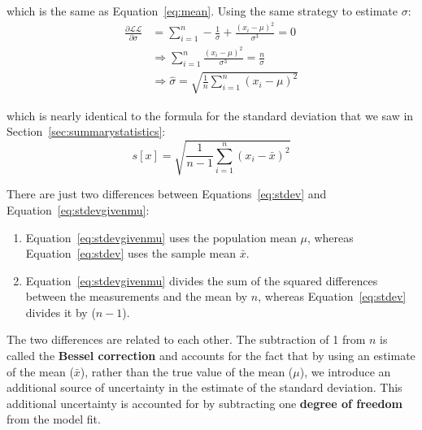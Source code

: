 \begin{refsection}
\noindent which is the same as Equation~\ref{eq:mean}. Using the same
strategy to estimate $\sigma$:
\begin{equation}
  \begin{split}
    \frac{\partial{\mathcal{LL}}}{\partial{\sigma}} & =
    \sum\limits_{i=1}^{n} - \frac{1}{\sigma} +  \frac{(x_i-\mu)^2}{\sigma^3} = 0\\
    & \Rightarrow  \sum\limits_{i=1}^{n} \frac{(x_i-\mu)^2}{\sigma^3} = \frac{n}{\sigma} \\
    & \Rightarrow \hat{\sigma} = \sqrt{\frac{1}{n}\sum\limits_{i=1}^{n}(x_i-\mu)^2}
  \end{split}
  \label{eq:stdevgivenmu}
\end{equation}

\noindent which is nearly identical to the formula for the standard
deviation that we saw in Section~\ref{sec:summarystatistics}:
\begin{equation}
  s[x] = \sqrt{\frac{1}{n-1}\sum\limits_{i=1}^{n}(x_i-\bar{x})^2}
  \label{eq:stdev}
\end{equation}

There are just two differences between
Equations~\ref{eq:stdev} and
Equation~\ref{eq:stdevgivenmu}:
\begin{enumerate}
\item Equation~\ref{eq:stdevgivenmu} uses the population mean $\mu$,
  whereas Equation~\ref{eq:stdev} uses the sample mean $\bar{x}$.
\item Equation~\ref{eq:stdevgivenmu} divides the sum of the squared
  differences between the measurements and the mean by $n$, whereas
  Equation~\ref{eq:stdev} divides it by ($n-1$).
\end{enumerate}

The two differences are related to each other. The subtraction of 1
from $n$ is called the \textbf{Bessel correction} and accounts for the
fact that by using an estimate of the mean ($\bar{x}$), rather than
the true value of the mean ($\mu$), we introduce an additional source
of uncertainty in the estimate of the standard deviation. This
additional uncertainty is accounted for by subtracting one
\textbf{degree of freedom} from the model fit.\\


\end{refsection}
